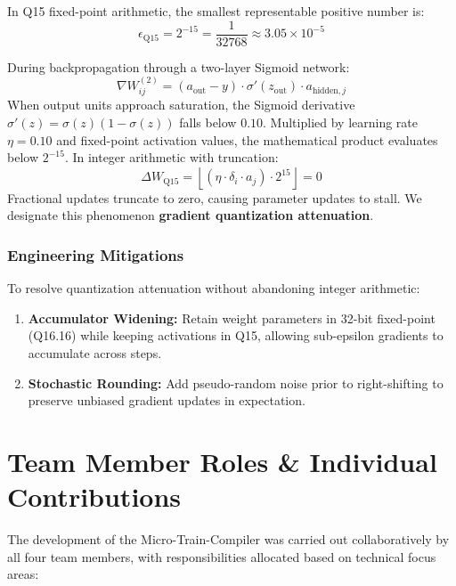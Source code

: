 \documentclass[12pt,a4paper]{report}
\begin{document}
In Q15 fixed-point arithmetic, the smallest representable positive number is:
\begin{equation}
    \epsilon_{\text{Q15}} = 2^{-15} = \frac{1}{32768} \approx 3.05 \times 10^{-5}
\end{equation}

During backpropagation through a two-layer Sigmoid network:
\begin{equation}
    \nabla W_{ij}^{(2)} = (a_{\text{out}} - y) \cdot \sigma'(z_{\text{out}}) \cdot a_{\text{hidden}, j}
\end{equation}
When output units approach saturation, the Sigmoid derivative $\sigma'(z) = \sigma(z)(1 - \sigma(z))$ falls below $0.10$. Multiplied by learning rate $\eta = 0.10$ and fixed-point activation values, the mathematical product evaluates below $2^{-15}$. In integer arithmetic with truncation:
\begin{equation}
    \Delta W_{\text{Q15}} = \left\lfloor (\eta \cdot \delta_i \cdot a_j) \cdot 2^{15} \right\rfloor = 0
\end{equation}
Fractional updates truncate to zero, causing parameter updates to stall. We designate this phenomenon \textbf{gradient quantization attenuation}.

\subsection{Engineering Mitigations}
To resolve quantization attenuation without abandoning integer arithmetic:
\begin{enumerate}
    \item \textbf{Accumulator Widening:} Retain weight parameters in 32-bit fixed-point (Q16.16) while keeping activations in Q15, allowing sub-epsilon gradients to accumulate across steps.
    \item \textbf{Stochastic Rounding:} Add pseudo-random noise prior to right-shifting to preserve unbiased gradient updates in expectation.
\end{enumerate}

\chapter{Team Member Roles \& Individual Contributions}

The development of the Micro-Train-Compiler was carried out collaboratively by all four team members, with responsibilities allocated based on technical focus areas:
\end{document}
